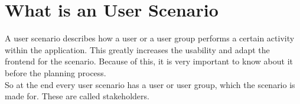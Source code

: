 \section{What is an User Scenario}
A user scenario describes how a user or a user group performs a certain activity within the application. This greatly increases the usability and adapt the frontend for the scenario. Because of this, it is very important to know about it before the planning process.
\\[10pt]
So at the end every user scenario has a user or user group, which the scenario is made for. These are called stakeholders.

